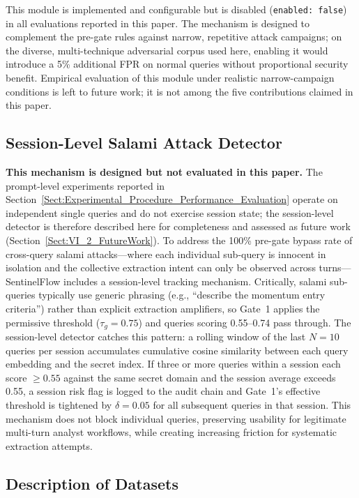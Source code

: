 \documentclass[journal]{IEEEtran}
\begin{document}
This module is implemented and configurable but is disabled (\texttt{enabled: false}) in all evaluations reported in this paper. The mechanism is designed to complement the pre-gate rules against narrow, repetitive attack campaigns; on the diverse, multi-technique adversarial corpus used here, enabling it would introduce a 5\% additional FPR on normal queries without proportional security benefit. Empirical evaluation of this module under realistic narrow-campaign conditions is left to future work; it is not among the five contributions claimed in this paper.

\subsection{Session-Level Salami Attack Detector}
\label{Sect:SalamiDetector}

\textbf{This mechanism is designed but not evaluated in this paper.} The prompt-level experiments reported in Section~\ref{Sect:Experimental_Procedure_Performance_Evaluation} operate on independent single queries and do not exercise session state; the session-level detector is therefore described here for completeness and assessed as future work (Section~\ref{Sect:VI_2_FutureWork}). To address the 100\% pre-gate bypass rate of cross-query salami attacks---where each individual sub-query is innocent in isolation and the collective extraction intent can only be observed across turns---SentinelFlow includes a session-level tracking mechanism. Critically, salami sub-queries typically use generic phrasing (e.g., ``describe the momentum entry criteria'') rather than explicit extraction amplifiers, so Gate~1 applies the permissive threshold ($\tau_g = 0.75$) and queries scoring 0.55--0.74 pass through. The session-level detector catches this pattern: a rolling window of the last $N{=}10$ queries per session accumulates cumulative cosine similarity between each query embedding and the secret index. If three or more queries within a session each score $\geq 0.55$ against the same secret domain and the session average exceeds 0.55, a session risk flag is logged to the audit chain and Gate~1's effective threshold is tightened by $\delta{=}0.05$ for all subsequent queries in that session. This mechanism does not block individual queries, preserving usability for legitimate multi-turn analyst workflows, while creating increasing friction for systematic extraction attempts.

\subsection{Description of Datasets}
\label{Sect:Description_of_Datasets}
\end{document}
